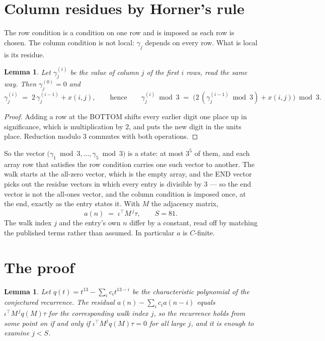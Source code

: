 \documentclass[11pt,a4paper]{article}
\theoremstyle{plain}
\newtheorem{lemma}[theorem]{Lemma}
\theoremstyle{definition}
\begin{document}
\section{Column residues by Horner's rule}

The row condition is a condition on one row and is imposed as each row is chosen. The column
condition is not local: $\gamma_j$ depends on every row. What is local is its residue.

\begin{lemma}\label{lem:horner}
Let $\gamma_j^{(i)}$ be the value of column $j$ of the first $i$ rows, read the same way.
Then $\gamma_j^{(0)}=0$ and
\[
\gamma_j^{(i)}\;=\;2\,\gamma_j^{(i-1)}+x(i,j),
\qquad\text{hence}\qquad
\gamma_j^{(i)}\bmod 3\;=\;
\bigl(2\,(\gamma_j^{(i-1)}\bmod 3)+x(i,j)\bigr)\bmod 3 .
\]
\end{lemma}

\begin{proof}
Adding a row at the BOTTOM shifts every earlier digit one place up in significance, which is
multiplication by $2$, and puts the new digit in the units place. Reduction modulo
$3$ commutes with both operations.
\end{proof}

So the vector $\bigl(\gamma_1\bmod 3,\dots,\gamma_{5}\bmod
3\bigr)$ is a state: at most $3^{5}$ of them, and each array row
that satisfies the row condition carries one such vector to another. The walk starts at the
all-zero vector, which is the empty array, and the END vector picks out the residue vectors in
which every entry is divisible by $3$ --- so the end vector is not the all-ones
vector, and the column condition is imposed once, at the end, exactly as the entry states it.
With $M$ the adjacency matrix,
\[
a(n)\;=\;\iota^{\!\top}M^{\,j}\tau ,\qquad S=81.
\]
The walk index $j$ and the entry's own $n$ differ by a constant, read off by matching the
published terms rather than assumed. In particular $a$ is $C$-finite.

\section{The proof}

\begin{lemma}\label{lem:crit}
Let $q(t)=t^{13}-\sum_i c_it^{13-i}$ be the characteristic polynomial of the
conjectured recurrence. The residual $a(n)-\sum_ic_ia(n-i)$ equals
$\iota^{\!\top}M^{\,j}q(M)\tau$ for the corresponding walk index $j$, so the recurrence
holds from some point on if and only if $\iota^{\!\top}M^{j}q(M)\tau=0$ for all large $j$,
and it is enough to examine $j<S$.
\end{lemma}
\end{document}
